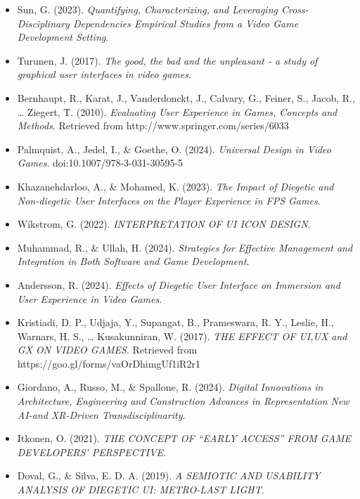 \begin{itemize}
    \item Sun, G. (2023). \textit{Quantifying, Characterizing, and Leveraging Cross-Disciplinary Dependencies Empirical Studies from a Video Game Development Setting}.

    \item Turunen, J. (2017). \textit{The good, the bad and the unpleasant - a study of graphical user interfaces in video games}.

    \item Bernhaupt, R., Karat, J., Vanderdonckt, J., Calvary, G., Feiner, S., Jacob, R., … Ziegert, T. (2010). \textit{Evaluating User Experience in Games, Concepts and Methods}. Retrieved from http://www.springer.com/series/6033

    \item Palmquist, A., Jedel, I., \& Goethe, O. (2024). \textit{Universal Design in Video Games}. doi:10.1007/978-3-031-30595-5

    \item Khazanehdarloo, A., \& Mohamed, K. (2023). \textit{The Impact of Diegetic and Non-diegetic User Interfaces on the Player Experience in FPS Games}.

    \item Wikstrom, G. (2022). \textit{INTERPRETATION OF UI ICON DESIGN}.

    \item Muhammad, R., \& Ullah, H. (2024). \textit{Strategies for Effective Management and Integration in Both Software and Game Development}.

    \item Andersson, R. (2024). \textit{Effects of Diegetic User Interface on Immersion and User Experience in Video Games}.

    \item Kristiadi, D. P., Udjaja, Y., Supangat, B., Prameswara, R. Y., Leslie, H., Warnars, H. S., … Kusakunniran, W. (2017). \textit{THE EFFECT OF UI,UX and GX ON VIDEO GAMES}. Retrieved from https://goo.gl/forms/vaOrDhimgUf1iR2r1

    \item Giordano, A., Russo, M., \& Spallone, R. (2024). \textit{Digital Innovations in Architecture, Engineering and Construction Advances in Representation New AI-and XR-Driven Transdisciplinarity}.

    \item Itkonen, O. (2021). \textit{THE CONCEPT OF “EARLY ACCESS” FROM GAME DEVELOPERS’ PERSPECTIVE}.

    \item Doval, G., \& Silva, E. D. A. (2019). \textit{A SEMIOTIC AND USABILITY ANALYSIS OF DIEGETIC UI: METRO-LAST LIGHT}.


\end{itemize}

